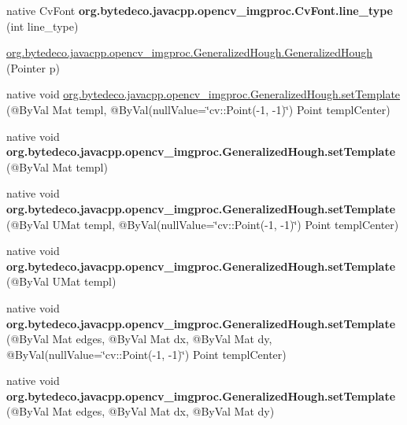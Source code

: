 \begin{DoxyCompactItemize}
\item 
\mbox{\label{group__imgproc_ga5bd93072f0d7d13a447575e68e2a5b0e}} 
native Cv\+Font {\bfseries org.\+bytedeco.\+javacpp.\+opencv\+\_\+imgproc.\+Cv\+Font.\+line\+\_\+type} (int line\+\_\+type)
\item 
\hyperlink{group__imgproc_ga132d7d11159b6bc9833bb4597ee499d2}{org.\+bytedeco.\+javacpp.\+opencv\+\_\+imgproc.\+Generalized\+Hough.\+Generalized\+Hough} (Pointer p)
\item 
native void \hyperlink{group__imgproc_ga16cb031da52c3fe55c8196bca11a72f3}{org.\+bytedeco.\+javacpp.\+opencv\+\_\+imgproc.\+Generalized\+Hough.\+set\+Template} (@By\+Val Mat templ, @By\+Val(null\+Value=\char`\"{}cv\+::\+Point(-\/1, -\/1)\char`\"{}) Point templ\+Center)
\item 
\mbox{\label{group__imgproc_gab308a162f7c55f2d1f356f07f01a5edd}} 
native void {\bfseries org.\+bytedeco.\+javacpp.\+opencv\+\_\+imgproc.\+Generalized\+Hough.\+set\+Template} (@By\+Val Mat templ)
\item 
\mbox{\label{group__imgproc_ga2d7f24941ef6d19ac9fb262921b8beeb}} 
native void {\bfseries org.\+bytedeco.\+javacpp.\+opencv\+\_\+imgproc.\+Generalized\+Hough.\+set\+Template} (@By\+Val U\+Mat templ, @By\+Val(null\+Value=\char`\"{}cv\+::\+Point(-\/1, -\/1)\char`\"{}) Point templ\+Center)
\item 
\mbox{\label{group__imgproc_gae806815421360d76961d4e861e9d0361}} 
native void {\bfseries org.\+bytedeco.\+javacpp.\+opencv\+\_\+imgproc.\+Generalized\+Hough.\+set\+Template} (@By\+Val U\+Mat templ)
\item 
\mbox{\label{group__imgproc_ga60ec03951009de9dac03edf6bdd7d2ff}} 
native void {\bfseries org.\+bytedeco.\+javacpp.\+opencv\+\_\+imgproc.\+Generalized\+Hough.\+set\+Template} (@By\+Val Mat edges, @By\+Val Mat dx, @By\+Val Mat dy, @By\+Val(null\+Value=\char`\"{}cv\+::\+Point(-\/1, -\/1)\char`\"{}) Point templ\+Center)
\item 
\mbox{\label{group__imgproc_gaee66bb5449f1696593b72ddac21ee537}} 
native void {\bfseries org.\+bytedeco.\+javacpp.\+opencv\+\_\+imgproc.\+Generalized\+Hough.\+set\+Template} (@By\+Val Mat edges, @By\+Val Mat dx, @By\+Val Mat dy)

\end{DoxyCompactItemize}
